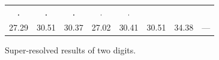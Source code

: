 \documentclass[10pt,twocolumn,letterpaper]{article}
\begin{document}
\begin{figure}
{\begin{tabular}{cccccccc}
  \includegraphics[width = 0.05\textwidth]{./fig/digit_6_srcnn.jpg} & 
  \includegraphics[width = 0.05\textwidth]{./fig/digit_6_aplus.jpg} & 
  \includegraphics[width = 0.05\textwidth]{./fig/digit_6_jor.jpg} & 
  \includegraphics[width = 0.05\textwidth]{./fig/digit_6_aplus_r.jpg} &
    \includegraphics[width = 0.05\textwidth]{./fig/digit_6_original.jpg} \\
  27.29 & 30.51 & 30.37 & 27.02 & 30.41 & 30.51 & 34.38 & --- \\
\end{tabular}
}
   \caption{Super-resolved results of two digits.}
\label{fig:dr}
\end{figure}
\end{document}
